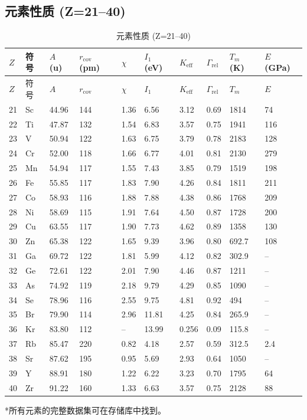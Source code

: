 \documentclass[12pt,a4paper]{article}
\newcommand{\Keff}{K_{\mathrm{eff}}}
\begin{document}
	\subsection*{元素性质 (Z=21–40)}
	
	\begin{longtable}{p{0.6cm}p{1.2cm}p{1.2cm}p{1.2cm}p{1.2cm}p{1.2cm}p{1.5cm}p{1.2cm}p{1.2cm}p{1.2cm}}
		\caption{元素性质 (Z=21–40)} \label{tab:elem-data-21to40} \\
		\toprule
		\(Z\) & 符号 & \(A\) (u) & \(r_{\text{cov}}\) (pm) & \(\chi\) & \(I_1\) (eV) & \(\Keff\) & \(\Gamma_{\text{rel}}\) & \(T_m\) (K) & \(E\) (GPa) \\
		\midrule
		\endfirsthead
		\toprule
		\(Z\) & 符号 & \(A\) & \(r_{\text{cov}}\) & \(\chi\) & \(I_1\) & \(\Keff\) & \(\Gamma_{\text{rel}}\) & \(T_m\) & \(E\) \\
		\midrule
		\endhead
		21 & Sc & 44.96 & 144 & 1.36 & 6.56 & 3.12 & 0.69 & 1814 & 74 \\
		22 & Ti & 47.87 & 132 & 1.54 & 6.83 & 3.57 & 0.75 & 1941 & 116 \\
		23 & V  & 50.94 & 122 & 1.63 & 6.75 & 3.79 & 0.78 & 2183 & 128 \\
		24 & Cr & 52.00 & 118 & 1.66 & 6.77 & 4.01 & 0.81 & 2130 & 279 \\
		25 & Mn & 54.94 & 117 & 1.55 & 7.43 & 3.85 & 0.79 & 1519 & 198 \\
		26 & Fe & 55.85 & 117 & 1.83 & 7.90 & 4.26 & 0.84 & 1811 & 211 \\
		27 & Co & 58.93 & 116 & 1.88 & 7.88 & 4.38 & 0.86 & 1768 & 209 \\
		28 & Ni & 58.69 & 115 & 1.91 & 7.64 & 4.50 & 0.87 & 1728 & 200 \\
		29 & Cu & 63.55 & 117 & 1.90 & 7.73 & 4.62 & 0.89 & 1358 & 130 \\
		30 & Zn & 65.38 & 122 & 1.65 & 9.39 & 3.96 & 0.80 & 692.7 & 108 \\
		31 & Ga & 69.72 & 122 & 1.81 & 5.99 & 4.12 & 0.82 & 302.9 & – \\
		32 & Ge & 72.61 & 122 & 2.01 & 7.90 & 4.46 & 0.87 & 1211 & – \\
		33 & As & 74.92 & 119 & 2.18 & 9.79 & 4.29 & 0.85 & 1090 & – \\
		34 & Se & 78.96 & 116 & 2.55 & 9.75 & 4.81 & 0.92 & 494 & – \\
		35 & Br & 79.90 & 114 & 2.96 & 11.81 & 4.25 & 0.84 & 265.9 & – \\
		36 & Kr & 83.80 & 112 & –    & 13.99 & 0.256 & 0.09 & 115.8 & – \\
		37 & Rb & 85.47 & 220 & 0.82 & 4.18 & 2.57 & 0.59 & 312.5 & 2.4 \\
		38 & Sr & 87.62 & 195 & 0.95 & 5.69 & 2.93 & 0.64 & 1050 & – \\
		39 & Y  & 88.91 & 180 & 1.22 & 6.22 & 3.23 & 0.70 & 1795 & 64 \\
		40 & Zr & 91.22 & 160 & 1.33 & 6.63 & 3.57 & 0.75 & 2128 & 88 \\
		\bottomrule
	\end{longtable}
	*所有元素的完整数据集可在存储库中找到。
	
\end{document}
